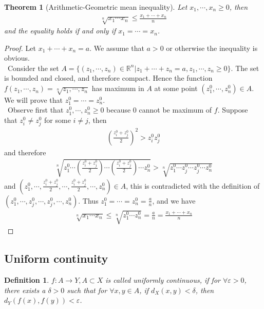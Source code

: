 \documentclass[12pt,leqno]{amsart}
\newtheorem{definition}{Definition}[section]
\newtheorem{theorem}{Theorem}[section]
\theoremstyle{definition}
\numberwithin{equation}{subsection}
\begin{document}
\begin{theorem}[Arithmetic-Geometric mean inequality]
Let $x_1,\cdots,x_n\geq 0$, then 
\begin{align*}
    \sqrt[n]{x_1 \cdots x_n}\leq \frac{x_1+\cdots+x_n}{n}
\end{align*}
and the equality holds if and only if $x_1=\cdots=x_n$.
\end{theorem}
\begin{proof}
Let $x_1+\cdots+x_n = a$. We assume that $a > 0$ or otherwise the inequality is obvious. \\
\hspace*{1em}\, Consider the set $A = \{(z_1,\cdots,z_n)\in\mathbb{R}^n|z_1+\cdots+z_n = a, z_1,\cdots,z_n\geq 0\}$. The set is bounded and closed, and therefore compact. Hence the function $f(z_1,\cdots,z_n) = \sqrt[n]{z_1,\cdots,z_n}$ has maximum in $A$ at some point $(z_1^0,\cdots,z_n^0)\in A$. We will prove that $z_1^0=\cdots=z_n^0$.\\
\hspace*{1em}\, Observe first that $z_1^0,\cdots,z_n^0 \geq 0$ because $0$ cannot be maximum of $f$. Suppose that $z_i^0\neq z_j^0$ for some $i\neq j$, then 
\begin{align*}
    \left(\frac{z_i^0 + z_j^0}{2}\right)^2 > z_i^0 z_j^0
\end{align*}
and therefore
\begin{align*}
    \sqrt[n]{z_1^0\cdots\left(\frac{z_i^0 + z_j^0}{2}\right) \cdots \left(\frac{z_i^0 + z_j^0}{2}\right)\cdots  z_n^0} > \sqrt[n]{z_1^0\cdots z_j^0 \cdots z_j^0\cdots  z_n^0}
\end{align*}
and $\left( z_1^0,\cdots,\frac{z_i^0 + z_j^0}{2},\cdots,\frac{z_i^0 + z_j^0}{2},\cdots,z_n^0\right)\in A$, this is contradicted with the definition of $(z_1^0,\cdots,z_j^0,\cdots,z_j^0,\cdots,z_n^0)$. Thus $z_1^0 = \cdots = z_n^0 = \frac{a}{n}$, and we have 
\begin{align*}
    \sqrt[n]{x_1\cdots x_n} \leq \sqrt[n]{z_1^0 \cdots z_n^0} = \frac{a}{n} = \frac{x_1 + \cdots + x_n}{n}
\end{align*}
\end{proof}

\medskip

\subsection{Uniform continuity}
\begin{definition}
$f:A\to Y, A\subset X$ is called uniformly continuous, if for $\forall \varepsilon > 0$, there exists a $\delta > 0$ such that for $\forall x,y\in A$, if $d_X(x,y)<\delta$, then $d_Y(f(x),f(y))<\varepsilon$. 
\end{definition}
\end{document}
